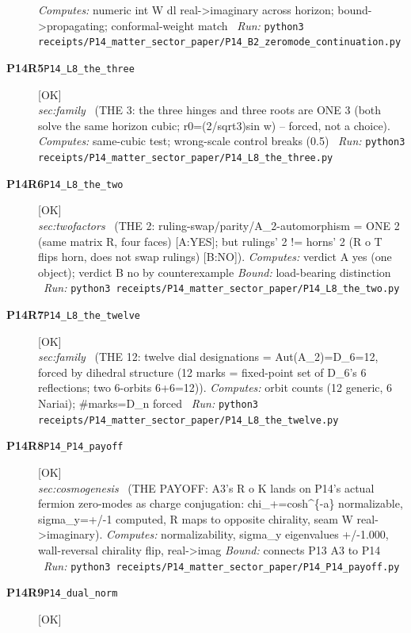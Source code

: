 \begin{description}
\emph{Computes:} numeric int W dl real->imaginary across horizon; bound->propagating; conformal-weight match
\ \emph{Run:} \texttt{python3 receipts/P14\_matter\_sector\_paper/P14\_B2\_zeromode\_continuation.py}
\item[\rcptlabel{P14_L8_the_three}{P14R5}\textbf{P14R5}\quad\texttt{P14\_L8\_the\_three}]\hfill\textsf{[OK]}\\
\textit{sec:family} \ (THE 3: the three hinges and three roots are ONE 3 (both solve the same horizon cubic; r0=(2/sqrt3)sin w) -- forced, not a choice). 
\emph{Computes:} same-cubic test; wrong-scale control breaks (0.5)
\ \emph{Run:} \texttt{python3 receipts/P14\_matter\_sector\_paper/P14\_L8\_the\_three.py}
\item[\rcptlabel{P14_L8_the_two}{P14R6}\textbf{P14R6}\quad\texttt{P14\_L8\_the\_two}]\hfill\textsf{[OK]}\\
\textit{sec:twofactors} \ (THE 2: ruling-swap/parity/A\_2-automorphism = ONE 2 (same matrix R, four faces) [A:YES]; but rulings' 2 != horns' 2 (R o T flips horn, does not swap rulings) [B:NO]). 
\emph{Computes:} verdict A yes (one object); verdict B no by counterexample
 \emph{Bound:} load-bearing distinction
\ \emph{Run:} \texttt{python3 receipts/P14\_matter\_sector\_paper/P14\_L8\_the\_two.py}
\item[\rcptlabel{P14_L8_the_twelve}{P14R7}\textbf{P14R7}\quad\texttt{P14\_L8\_the\_twelve}]\hfill\textsf{[OK]}\\
\textit{sec:family} \ (THE 12: twelve dial designations = \textbar{}Aut(A\_2)\textbar{}=\textbar{}D\_6\textbar{}=12, forced by dihedral structure (12 marks = fixed-point set of D\_6's 6 reflections; two 6-orbits 6+6=12)). 
\emph{Computes:} orbit counts (12 generic, 6 Nariai); \#marks=\textbar{}D\_n\textbar{} forced
\ \emph{Run:} \texttt{python3 receipts/P14\_matter\_sector\_paper/P14\_L8\_the\_twelve.py}
\item[\rcptlabel{P14_P14_payoff}{P14R8}\textbf{P14R8}\quad\texttt{P14\_P14\_payoff}]\hfill\textsf{[OK]}\\
\textit{sec:cosmogenesis} \ (THE PAYOFF: A3's R o K lands on P14's actual fermion zero-modes as charge conjugation: chi\_+=cosh\textasciicircum{}\{-a\} normalizable, sigma\_y=+/-1 computed, R maps to opposite chirality, seam W real->imaginary). 
\emph{Computes:} normalizability, sigma\_y eigenvalues +/-1.000, wall-reversal chirality flip, real->imag
 \emph{Bound:} connects P13 A3 to P14
\ \emph{Run:} \texttt{python3 receipts/P14\_matter\_sector\_paper/P14\_P14\_payoff.py}
\item[\rcptlabel{P14_dual_norm}{P14R9}\textbf{P14R9}\quad\texttt{P14\_dual\_norm}]\hfill\textsf{[OK]}\\

\end{description}
